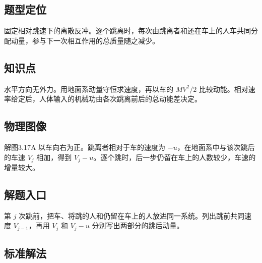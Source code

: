 \documentclass[UTF8,fontset=fandol,a4paper,11pt]{ctexart}
\begin{document}


\subsection*{题型定位}

固定相对跳速下的离散反冲。逐个跳离时，每次由跳离者和还在车上的人车共同分配动量，参与下一次相互作用的总质量随之减少。



\subsection*{知识点}

水平方向无外力。用地面系动量守恒求速度，再以车的 $MV^2/2$ 比较动能。相对速率给定后，人体输入的机械功由各次跳离前后的总动能差决定。




\subsection*{物理图像}

解图3.17A 以车向右为正。跳离者相对于车的速度为 $-u$，在地面系中与该次跳后的车速 $V_j$ 相加，得到 $V_j-u$。逐个跳时，后一步仍留在车上的人数较少，车速的增量较大。



\subsection*{解题入口}

第 $j$ 次跳前，把车、将跳的人和仍留在车上的人放进同一系统。列出跳前共同速度 $V_{j-1}$，再用 $V_j$ 和 $V_j-u$ 分别写出两部分的跳后动量。



\subsection*{标准解法}
\end{document}
